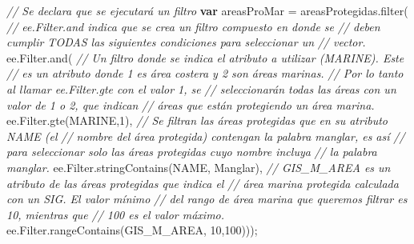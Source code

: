 \documentclass[
  12pt,
  letterpaper,
  twoside]{book}
\newenvironment{Shaded}{\begin{snugshade}}{\end{snugshade}}
\newcommand{\AttributeTok}[1]{\textcolor[rgb]{0.48,0.12,0.64}{#1}}
\newcommand{\CommentTok}[1]{\textcolor[rgb]{0.24,0.58,0.00}{\textit{#1}}}
\newcommand{\ControlFlowTok}[1]{\textcolor[rgb]{0.00,0.00,0.00}{\textbf{#1}}}
\newcommand{\DecValTok}[1]{\textcolor[rgb]{0.28,0.53,0.93}{#1}}
\newcommand{\FunctionTok}[1]{\textcolor[rgb]{0.48,0.12,0.64}{#1}}
\newcommand{\KeywordTok}[1]{\textcolor[rgb]{0.48,0.12,0.64}{#1}}
\newcommand{\NormalTok}[1]{#1}
\newcommand{\OperatorTok}[1]{\textcolor[rgb]{0.00,0.00,0.00}{#1}}
\newcommand{\StringTok}[1]{\textcolor[rgb]{0.87,0.29,0.22}{#1}}
\begin{document}
\begin{Shaded}
\begin{Highlighting}[]
\CommentTok{// Se declara que se ejecutará un filtro}
\ControlFlowTok{var}\NormalTok{ areasProMar }\OperatorTok{=}\NormalTok{ areasProtegidas}\OperatorTok{.}\FunctionTok{filter}\NormalTok{( }
  \CommentTok{// ee.Filter.and indica que se crea un filtro compuesto en donde se }
  \CommentTok{// deben cumplir TODAS las siguientes condiciones para seleccionar un }
  \CommentTok{// vector.}
  \KeywordTok{ee}\OperatorTok{.}\AttributeTok{Filter}\OperatorTok{.}\FunctionTok{and}\NormalTok{(    }
  \CommentTok{// Un filtro donde se indica el atributo a utilizar (\textquotesingle{}MARINE\textquotesingle{}). Este }
  \CommentTok{// es un atributo donde 1 es área costera y 2 son áreas marinas.}
  \CommentTok{// Por lo tanto al llamar ee.Filter.gte con el valor 1, se }
  \CommentTok{// seleccionarán todas las áreas con un valor de 1 o 2, que indican}
  \CommentTok{// áreas que están protegiendo un área marina.}
  \KeywordTok{ee}\OperatorTok{.}\AttributeTok{Filter}\OperatorTok{.}\FunctionTok{gte}\NormalTok{(}\StringTok{\textquotesingle{}MARINE\textquotesingle{}}\OperatorTok{,}\DecValTok{1}\NormalTok{)}\OperatorTok{,}   
  \CommentTok{// Se filtran las áreas protegidas que en su atributo \textquotesingle{}NAME\textquotesingle{} (el }
  \CommentTok{// nombre del área protegida) contengan la  palabra \textquotesingle{}manglar\textquotesingle{}, es así}
  \CommentTok{// para seleccionar solo las áreas protegidas cuyo nombre incluya }
  \CommentTok{// la palabra manglar.}
  \KeywordTok{ee}\OperatorTok{.}\AttributeTok{Filter}\OperatorTok{.}\FunctionTok{stringContains}\NormalTok{(}\StringTok{\textquotesingle{}NAME\textquotesingle{}}\OperatorTok{,} \StringTok{\textquotesingle{}Manglar\textquotesingle{}}\NormalTok{)}\OperatorTok{,}
  \CommentTok{// \textquotesingle{}GIS\_M\_AREA\textquotesingle{} es un atributo de las áreas protegidas que indica el }
  \CommentTok{// área marina protegida calculada con un SIG. El valor mínimo }
  \CommentTok{// del rango de área marina que queremos filtrar es 10, mientras que }
  \CommentTok{// 100 es el valor máximo.}
  \KeywordTok{ee}\OperatorTok{.}\AttributeTok{Filter}\OperatorTok{.}\FunctionTok{rangeContains}\NormalTok{(}\StringTok{\textquotesingle{}GIS\_M\_AREA\textquotesingle{}}\OperatorTok{,} \DecValTok{10}\OperatorTok{,}\DecValTok{100}\NormalTok{)))}\OperatorTok{;} 
\end{Highlighting}
\end{Shaded}
\end{document}
